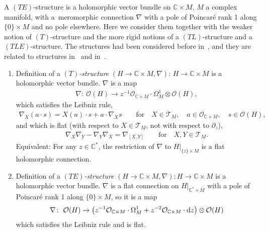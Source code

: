 \documentclass[10pt,a4paper]{amsart}
\numberwithin{equation}{section}
\numberwithin{figure}{section}
\newcommand{\C}{{\mathbb C}}
\newcommand{\OO}{{\mathcal O}}
\newcommand{\TT}{{\mathcal T}}
\newcommand{\paa}{\partial}
\newcommand{\nnn}{\nabla}
\begin{document}
A $(TE)$-structure is a holomorphic vector bundle
on $\C\times M$, $M$ a complex manifold, with a~meromorphic connection $\nnn$ with a pole of
Poincar\'e rank 1 along $\{0\}\times M$ and no pole elsewhere.
Here we consider them together with the weaker notion
of $(T)$-structure and the more rigid notions
of a $(TL)$-structure and a $(TLE)$-structure.
The structures had been considered before in~\cite{HM04},
and they are related to structures in~\cite[Chapter~VII]{Sa02}
and in~\cite{Sa05}.

\begin{Definition}\label{t3.1}\qquad
\begin{enumerate}\itemsep=-2pt
\item[$(a)$] Definition of a {\it $(T)$-structure}
$(H\to\C\times M,\nabla)$:
$H\to\C\times M$ is a holomorphic vector bundle.
$\nabla$ is a map\vspace{-.5ex}
\begin{gather}\label{3.1}
\nabla\colon\ \OO(H)\to z^{-1}\OO_{\C\times M}\cdot \Omega^1_M\otimes \OO(H),
\end{gather}
which satisfies the Leibniz rule,\vspace{-.5ex}
\begin{gather*}
\nnn_X(a\cdot s)= X(a)\cdot s+a\cdot \nnn_X s
\qquad\text{for}\quad X\in\TT_M,\quad a\in\OO_{\C\times M},\quad s\in \OO(H),
\end{gather*}
and which is flat (with respect to $X\in\TT_M$,
not with respect to $\paa_z$),\vspace{-.5ex}
\begin{gather*}
\nnn_X\nnn_Y-\nnn_Y\nnn_X=\nnn_{[X,Y]}
\qquad\text{for}\quad X,Y\in \TT_M.
\end{gather*}
Equivalent: For any $z\in\C^*$, the restriction of $\nabla$ to
$H|_{\{z\}\times M}$ is a flat holomorphic connection.

\item[$(b)$] Definition of a {\it $(TE)$-structure}
$(H\to\C\times M,\nabla)\colon H\to\C\times M$ is a holomorphic vector bundle.
$\nabla$ is a flat connection on $H|_{\C^*\times M}$ with a pole
of Poincar\'e rank 1 along $\{0\}\times M$, so it is a map\vspace{-.5ex}
\begin{gather*}%
\nabla\colon\ \OO(H)\to
\bigl(z^{-1}\OO_{\C\times M}\cdot\Omega^1_M
+z^{-2}\OO_{\C\times M}\cdot{\rm d}z\bigr)\otimes\OO(H)
\end{gather*}
which satisfies the Leibniz rule and is flat.


\end{enumerate}
\end{Definition}
\end{document}
